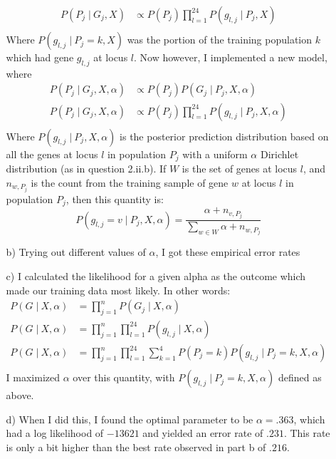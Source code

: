 \documentclass[11pt]{article}
\newcommand{\st}{ \; \big | \:}
\theoremstyle{definition}
\begin{document}
\begin{itemize}
\begin{itemize}
\begin{align*}
                    P(P_j \st G_j, X) &\propto P(P_j)\prod_{l=1}^{24} P(g_{l,j} \st P_j, X) \\
                \end{align*}
                Where $P(g_{l,j} \st P_j=k, X)$ was the portion of the training population $k$ which had gene $g_{l,j}$ at locus $l$. Now however, I implemented a new model, where
                \begin{align*}
                    P(P_j \st G_j, X, \alpha) &\propto P(P_j)P(G_j \st P_j, X, \alpha) \\
                    P(P_j \st G_j, X, \alpha) &\propto P(P_j)\prod_{l=1}^{24} P(g_{l,j} \st P_j, X, \alpha) \\
                \end{align*}
                Where $P(g_{l,j} \st P_j, X, \alpha)$ is the posterior prediction distribution based on all the genes at locus $l$ in population $P_j$ with a uniform $\alpha$ Dirichlet distribution (as in question 2.ii.b). If $W$ is the set of genes at locus $l$, and $n_{w,P_j}$ is the count from the training sample of gene $w$ at locus $l$ in population $P_j$, then this quantity is:
                \[ P(g_{l,j}=v \st P_j, X, \alpha) = \frac{\alpha + n_{v,P_j}}{\sum_{w\in W} \alpha +n_{w,P_j}} \]
            \item[b)]
                Trying out different values of $\alpha$, I got these empirical error rates
                \FloatBarrier
                
                \FloatBarrier
            \item[c)]
                I calculated the likelihood for a given alpha as the outcome which made our training data most likely. In other words:
                \begin{align*}
                    P(G \st X,\alpha) &= \prod_{j=1}^n P(G_j \st X,\alpha) \\ 
                    P(G \st X,\alpha) &= \prod_{j=1}^n \prod_{l=1}^{24} P(g_{l,j} \st X, \alpha) \\
                    P(G \st X,\alpha) &= \prod_{j=1}^n \prod_{l=1}^{24}\sum_{k=1}^4 P(P_j=k)P(g_{l,j} \st P_j=k, X, \alpha) \\
                \end{align*}
                I maximized $\alpha$ over this quantity, with \(P(g_{l,j} \st P_j=k, X, \alpha)\) defined as above.
            \item[d)]
                When I did this, I found the optimal parameter to be $\alpha=.363$, which had a log likelihood of $-13621$ and yielded an error rate of $.231$. This rate is only a bit higher than the best rate observed in part b of $.216$.

\end{itemize}
\end{itemize}
\end{document}

